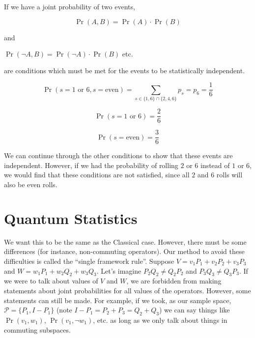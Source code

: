 \documentclass[a4paper,twoside,master.tex]{subfiles}
\begin{document}
If we have a joint probability of two events,

\begin{equation}
\Pr(A,B) = \Pr(A)\cdot \Pr(B)
\end{equation}

and

$\Pr(\neg A,B) = \Pr(\neg A)\cdot \Pr(B)$ etc.

are conditions which must be met for the events to be statistically
independent.

\begin{ex}

\begin{equation}
\Pr(s=1\text{ or }6, s=\text{even}) = \sum_{s\in\{1,6\}\cap\{2,4,6\}} p_s = p_6 = \frac{1}{6}
\end{equation}

\begin{equation}
\Pr(s=1\text{ or }6) = \frac{2}{6}
\end{equation}

\begin{equation}
\Pr(s=\text{even}) = \frac{3}{6}
\end{equation}

We can continue through the other conditions to show that these events
are independent. However, if we had the probability of rolling $2$ or
$6$ instead of $1$ or $6$, we would find that these conditions are
not satisfied, since all $2$ and $6$ rolls will also be even rolls.
\end{ex}

\section{Quantum Statistics}
\label{sec:quantum_statistics}


We want this to be the same as the Classical case. However, there must
be some differences (for instance, non-commuting operators). Our method
to avoid these difficulties is called the ``single framework rule''.
Suppose $V=v_1P_1+v_2P_2+v_3P_3$ and $W=w_1P_1+w_2Q_2+w_3Q_3$. Let's
imagine $P_2Q_2\neq Q_2P_2$ and $P_3Q_3\neq Q_3P_3$. If we were to
talk about values of $V$ and $W$, we are forbidden from making
statements about joint probabilities for all values of the operators.
However, some statements can still be made. For example, if we took, as
our sample space, $\mathcal{P} = \{P_1,I-P_1\}$ (note
$I-P_1 = P_2+P_3=Q_2+Q_3$) we can say things like $\Pr(v_1,w_1)$,
$\Pr(v_1,\neg w_1)$, etc. as long as we only talk about things in
commuting subspaces.
\end{document}
